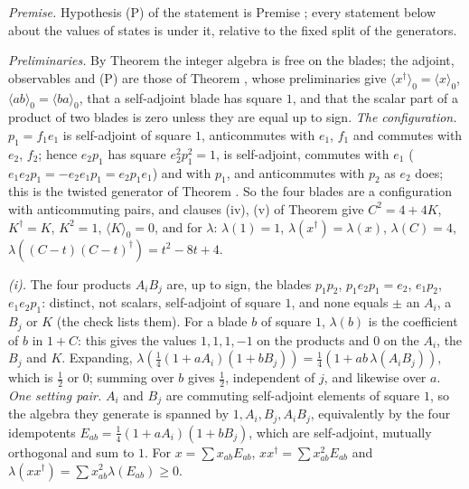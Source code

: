 \emph{Premise.} Hypothesis (P) of the statement is Premise ; every statement below about the values of states is under it, relative to the fixed split of the generators.

\emph{Preliminaries.} By Theorem  the integer algebra is free on the blades; the adjoint, observables and (P) are those of Theorem , whose preliminaries give $\langle x^{\dagger}\rangle_{0} = \langle x\rangle_{0}$, $\langle ab\rangle_{0} = \langle ba\rangle_{0}$, that a self-adjoint blade has square $1$, and that the scalar part of a product of two blades is zero unless they are equal up to sign. \emph{The configuration.} $p_{1} = f_{1}e_{1}$ is self-adjoint of square $1$, anticommutes with $e_{1}$, $f_{1}$ and commutes with $e_{2}$, $f_{2}$; hence $e_{2}p_{1}$ has square $e_{2}^{2}p_{1}^{2} = 1$, is self-adjoint, commutes with $e_{1}$ ($e_{1}e_{2}p_{1} = -e_{2}e_{1}p_{1} = e_{2}p_{1}e_{1}$) and with $p_{1}$, and anticommutes with $p_{2}$ as $e_{2}$ does; this is the twisted generator of Theorem . So the four blades are a configuration with anticommuting pairs, and clauses (iv), (v) of Theorem  give $C^{2} = 4 + 4K$, $K^{\dagger} = K$, $K^{2} = 1$, $\langle K\rangle_{0} = 0$, and for $\lambda$: $\lambda(1) = 1$, $\lambda(x^{\dagger}) = \lambda(x)$, $\lambda(C) = 4$, $\lambda((C - t)(C - t)^{\dagger}) = t^{2} - 8t + 4$.

\emph{(i).} The four products $A_{i}B_{j}$ are, up to sign, the blades $p_{1}p_{2}$, $p_{1}e_{2}p_{1} = e_{2}$, $e_{1}p_{2}$, $e_{1}e_{2}p_{1}$: distinct, not scalars, self-adjoint of square $1$, and none equals $\pm$ an $A_{i}$, a $B_{j}$ or $K$ (the check lists them). For a blade $b$ of square $1$, $\lambda(b)$ is the coefficient of $b$ in $1 + C$: this gives the values $1, 1, 1, -1$ on the products and $0$ on the $A_{i}$, the $B_{j}$ and $K$. Expanding, $\lambda(\tfrac14(1 + aA_{i})(1 + bB_{j})) = \tfrac14(1 + ab\,\lambda(A_{i}B_{j}))$, which is $\tfrac12$ or $0$; summing over $b$ gives $\tfrac12$, independent of $j$, and likewise over $a$. \emph{One setting pair.} $A_{i}$ and $B_{j}$ are commuting self-adjoint elements of square $1$, so the algebra they generate is spanned by $1, A_{i}, B_{j}, A_{i}B_{j}$, equivalently by the four idempotents $E_{ab} = \tfrac14(1 + aA_{i})(1 + bB_{j})$, which are self-adjoint, mutually orthogonal and sum to $1$. For $x = \sum x_{ab}E_{ab}$, $xx^{\dagger} = \sum x_{ab}^{2}E_{ab}$ and $\lambda(xx^{\dagger}) = \sum x_{ab}^{2}\lambda(E_{ab}) \ge 0$.

